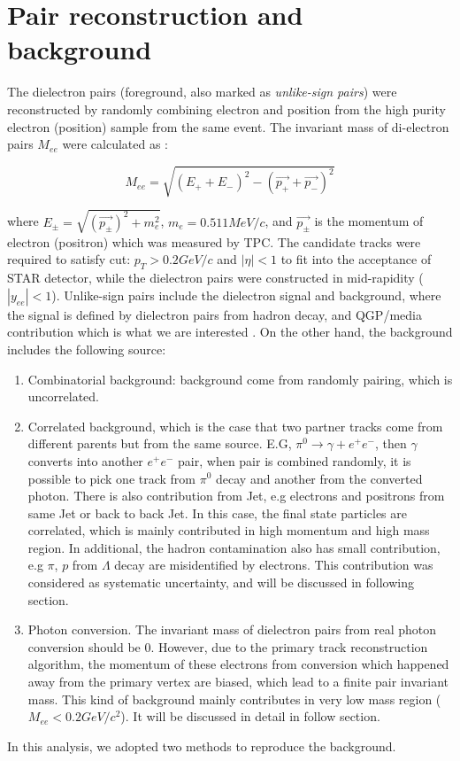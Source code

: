 \section{Pair reconstruction and background}

The dielectron pairs (foreground, also marked as \emph{unlike-sign
pairs}) were reconstructed by randomly combining electron and position
from the high purity electron (position) sample from the same event.
The invariant mass of di-electron pairs $M_{ee}$ were calculated
as :

\begin{equation}
M_{ee}=\sqrt{(E_{+}+E_{-})^{2}-(\overset{\rightarrow}{p_{+}}+\overset{\rightarrow}{p_{-}})^{2}}
\end{equation}


where $E_{\pm}=\sqrt{(\overset{\rightarrow}{p_{\pm}})^{2}+m_{e}^{2}}$,
$m_{e}=0.511MeV/c$, and $\overset{\rightarrow}{p_{\pm}}$ is the
momentum of electron (positron) which was measured by TPC. The candidate
tracks were required to satisfy cut: $p_{T}>0.2GeV/c$ and $|\eta|<1$
to fit into the acceptance of STAR detector, while the dielectron
pairs were constructed in mid-rapidity ($|y_{ee}|<1$). Unlike-sign
pairs include the dielectron signal and background, where the signal
is defined by dielectron pairs from hadron decay, and QGP/media contribution
which is what we are interested . On the other hand, the background
includes the following source:
\begin{enumerate}
\item Combinatorial background: background come from randomly pairing, which
is uncorrelated.
\item Correlated background, which is the case that two partner tracks come
from different parents but from the same source. E.G, $\pi^{0}\rightarrow\gamma+e^{+}e^{-}$,
then $\gamma$ converts into another $e^{+}e^{-}$ pair, when pair
is combined randomly, it is possible to pick one track from $\pi^{0}$
decay and another from the converted $ $photon. There is also contribution
from Jet, e.g electrons and positrons from same Jet or back to back
Jet. In this case, the final state particles are correlated, which
is mainly contributed in high momentum and high mass region. In additional,
the hadron contamination also has small contribution, e.g $\pi$,
$p$ from $\Lambda$ decay are misidentified by electrons. This contribution
was considered as systematic uncertainty, and will be discussed in
following section.
\item Photon conversion. The invariant mass of dielectron pairs from real
photon conversion should be 0. However, due to the primary track reconstruction
algorithm, the momentum of these electrons from conversion which happened
away from the primary vertex are biased, which lead to a finite pair
invariant mass. This kind of background mainly contributes in very
low mass region ($M_{ee}<0.2GeV/c^{2}$). It will be discussed in
detail in follow section.
\end{enumerate}
In this analysis, we adopted two methods to reproduce the background.


